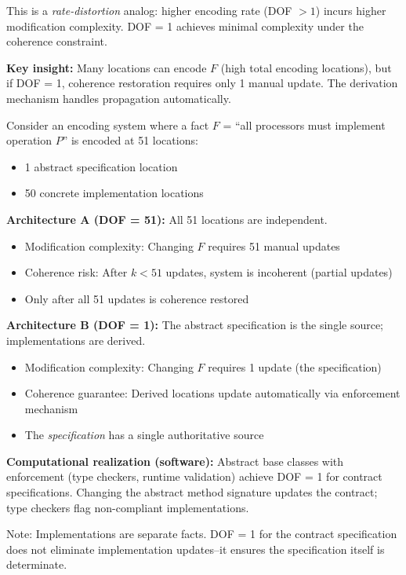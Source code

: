 This is a \emph{rate-distortion} analog: higher encoding rate (DOF $> 1$) incurs higher modification complexity. DOF = 1 achieves minimal complexity under the coherence constraint.

\textbf{Key insight:} Many locations can encode $F$ (high total encoding locations), but if DOF = 1, coherence restoration requires only 1 manual update. The derivation mechanism handles propagation automatically.

\begin{example}\label{ex:ssot-large-m}
Consider an encoding system where a fact $F$ = ``all processors must implement operation $P$'' is encoded at 51 locations:
\begin{itemize}
\tightlist
\item 1 abstract specification location
\item 50 concrete implementation locations
\end{itemize}

\textbf{Architecture A (DOF = 51):} All 51 locations are independent.
\begin{itemize}
\tightlist
\item Modification complexity: Changing $F$ requires 51 manual updates
\item Coherence risk: After $k < 51$ updates, system is incoherent (partial updates)
\item Only after all 51 updates is coherence restored
\end{itemize}

\textbf{Architecture B (DOF = 1):} The abstract specification is the single source; implementations are derived.
\begin{itemize}
\tightlist
\item Modification complexity: Changing $F$ requires 1 update (the specification)
\item Coherence guarantee: Derived locations update automatically via enforcement mechanism
\item The \emph{specification} has a single authoritative source
\end{itemize}

\textbf{Computational realization (software):} Abstract base classes with enforcement (type checkers, runtime validation) achieve DOF = 1 for contract specifications. Changing the abstract method signature updates the contract; type checkers flag non-compliant implementations.

Note: Implementations are separate facts. DOF = 1 for the contract specification does not eliminate implementation updates--it ensures the specification itself is determinate.
\end{example}

